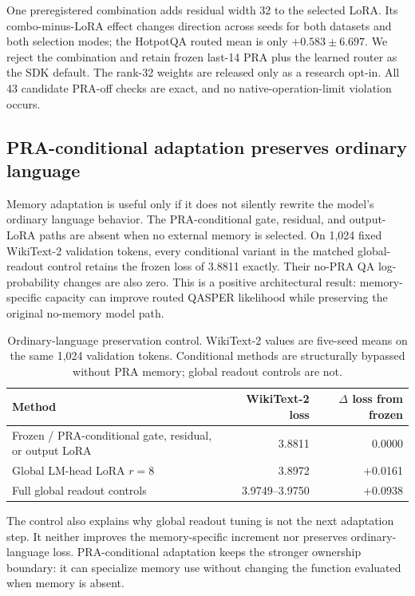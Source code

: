 \documentclass[11pt]{article}
\begin{document}
One preregistered combination adds residual width 32 to the selected LoRA. Its combo-minus-LoRA
effect changes direction across seeds for both datasets and both selection modes; the HotpotQA
routed mean is only $+0.583\pm6.697$. We reject the combination and retain frozen last-14 PRA plus
the learned router as the SDK default. The rank-32 weights are released only as a research opt-in.
All 43 candidate PRA-off checks are exact, and no native-operation-limit violation occurs.

\subsection{PRA-conditional adaptation preserves ordinary language}
\label{sec:wikitext-preservation}

Memory adaptation is useful only if it does not silently rewrite the model's ordinary language
behavior. The PRA-conditional gate, residual, and output-LoRA paths are absent when no external
memory is selected. On 1,024 fixed WikiText-2 validation tokens, every conditional variant in the
matched global-readout control retains the frozen loss of 3.8811 exactly. Their no-PRA QA
log-probability changes are also zero. This is a positive architectural result: memory-specific
capacity can improve routed QASPER likelihood while preserving the original no-memory model path.

\begin{table}[H]
\centering
\small
\caption{Ordinary-language preservation control. WikiText-2 values are five-seed means on the
same 1,024 validation tokens. Conditional methods are structurally bypassed without PRA memory;
global readout controls are not.}
\label{tab:wikitext-preservation}
\begin{tabular}{lrr}
\toprule
Method & WikiText-2 loss & $\Delta$ loss from frozen \\
\midrule
Frozen / PRA-conditional gate, residual, or output LoRA & 3.8811 & 0.0000 \\
Global LM-head LoRA $r=8$ & 3.8972 & +0.0161 \\
Full global readout controls & 3.9749--3.9750 & +0.0938 \\
\bottomrule
\end{tabular}
\end{table}

The control also explains why global readout tuning is not the next adaptation step. It neither
improves the memory-specific increment nor preserves ordinary-language loss. PRA-conditional
adaptation keeps the stronger ownership boundary: it can specialize memory use without changing
the function evaluated when memory is absent.
\end{document}
